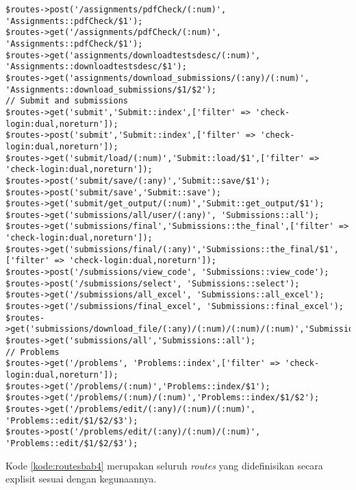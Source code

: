 \begin{lstlisting}[caption=Penambahan \textit{routes} yang digunakan pada aplikasi \textit{SharIF Judge}, label=kode:routesbab4]
$routes->post('/assignments/pdfCheck/(:num)', 'Assignments::pdfCheck/$1');
$routes->get('/assignments/pdfCheck/(:num)', 'Assignments::pdfCheck/$1');
$routes->get('assignments/downloadtestsdesc/(:num)', 'Assignments::downloadtestsdesc/$1');
$routes->get('assignments/download_submissions/(:any)/(:num)', 'Assignments::download_submissions/$1/$2');
// Submit and submissions
$routes->get('submit','Submit::index',['filter' => 'check-login:dual,noreturn']);
$routes->post('submit','Submit::index',['filter' => 'check-login:dual,noreturn']);
$routes->get('submit/load/(:num)','Submit::load/$1',['filter' => 'check-login:dual,noreturn']);
$routes->post('submit/save/(:any)','Submit::save/$1');
$routes->post('submit/save','Submit::save');
$routes->get('submit/get_output/(:num)','Submit::get_output/$1');
$routes->get('submissions/all/user/(:any)', 'Submissions::all');
$routes->get('submissions/final','Submissions::the_final',['filter' => 'check-login:dual,noreturn']);
$routes->get('submissions/final/(:any)','Submissions::the_final/$1',['filter' => 'check-login:dual,noreturn']);
$routes->post('/submissions/view_code', 'Submissions::view_code');
$routes->post('/submissions/select', 'Submissions::select');
$routes->get('/submissions/all_excel', 'Submissions::all_excel');
$routes->get('/submissions/final_excel', 'Submissions::final_excel');
$routes->get('submissions/download_file/(:any)/(:num)/(:num)/(:num)','Submissions::download_file/$1/$2/$3/$4');
$routes->get('submissions/all','Submissions::all');
// Problems
$routes->get('/problems', 'Problems::index',['filter' => 'check-login:dual,noreturn']);
$routes->get('/problems/(:num)','Problems::index/$1');
$routes->get('/problems/(:num)/(:num)','Problems::index/$1/$2');
$routes->get('/problems/edit/(:any)/(:num)/(:num)', 'Problems::edit/$1/$2/$3');
$routes->post('/problems/edit/(:any)/(:num)/(:num)', 'Problems::edit/$1/$2/$3');
\end{lstlisting}
Kode \ref{kode:routesbab4} merupakan seluruh \textit{routes} yang didefinisikan secara explisit sesuai dengan kegunaannya.

